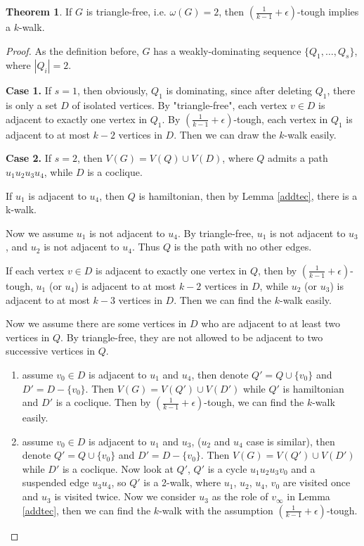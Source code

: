 \documentclass{amsart}
\theoremstyle{definition}
\newtheorem{theorem}{Theorem}
\begin{document}
\begin{theorem}\label{trifree}
If $G$ is triangle-free, i.e. $\omega(G)=2$, then $(\frac{1}{k-1}+\epsilon)$-tough implies a $k$-walk.
\end{theorem}




\begin{proof}
As the definition before, $G$ has a weakly-dominating sequence $\{Q_1,\ldots,Q_s\}$, where $|Q_i|=2$.

{\bf Case 1.} If $s=1$, then obviously, $Q_1$ is dominating, since after deleting $Q_1$, there is only a set $D$ of isolated vertices.
By "triangle-free", each vertex $v\in D$ is adjacent to exactly one vertex in $Q_1$. By $(\frac{1}{k-1}+\epsilon)$-tough, each vertex in $Q_1$ is adjacent to at most $k-2$ vertices in $D$. Then we can draw the $k$-walk easily.

{\bf Case 2.} If $s=2$, then $V(G)=V(Q)\cup V(D)$, where $Q$ admits a path $u_1u_2u_3u_4$, while $D$ is a coclique.


If $u_1$ is adjacent to $u_4$, then $Q$ is hamiltonian, then by Lemma \ref{addtec}, there is a k-walk.

Now we assume $u_1$ is not adjacent to $u_4$.
By triangle-free, $u_1$ is not adjacent to $u_3$, and $u_2$ is not adjacent to $u_4$. Thus $Q$ is the path with no other edges.

If each vertex $v\in D$ is adjacent to exactly one vertex in $Q$, then by $(\frac{1}{k-1}+\epsilon)$-tough, $u_1$ (or $u_4$) is adjacent to at most $k-2$ vertices in $D$, while $u_2$ (or $u_3$) is adjacent to at most $k-3$ vertices in $D$. Then we can find the $k$-walk easily.

Now we assume there are some vertices in $D$ who are adjacent to at least two vertices in $Q$.
By triangle-free, they are not allowed to be adjacent to two successive vertices in $Q$.

\begin{enumerate}
\item assume $v_0\in D$ is adjacent to $u_1$ and $u_4$, then denote $Q'=Q\cup\{v_0\}$ and $D'=D-\{v_0\}$. Then $V(G)=V(Q')\cup V(D')$ while $Q'$ is hamiltonian and $D'$ is a coclique. Then by $(\frac{1}{k-1}+\epsilon)$-tough, we can find the $k$-walk easily.
\item assume $v_0\in D$ is adjacent to $u_1$ and $u_3$, ($u_2$ and $u_4$ case is similar), then denote $Q'=Q\cup\{v_0\}$ and $D'=D-\{v_0\}$. Then $V(G)=V(Q')\cup V(D')$ while $D'$ is a coclique. Now look at $Q'$, $Q'$ is a cycle $u_1u_2u_3v_0$ and a suspended edge $u_3u_4$, so $Q'$ is a 2-walk, where $u_1$, $u_2$, $u_4$, $v_0$ are visited once and $u_3$ is visited twice. Now we consider $u_3$ as the role of $v_{\infty}$ in Lemma \ref{addtec}, then we can find the $k$-walk with the assumption $(\frac{1}{k-1}+\epsilon)$-tough.
\end{enumerate}


\end{proof}
\end{document}
